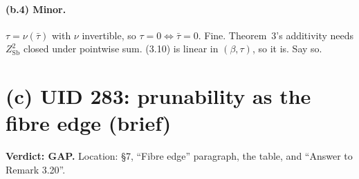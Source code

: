 \documentclass[11pt]{article}
\newcommand{\verdict}[1]{\textbf{Verdict: #1.}}
\begin{document}
\paragraph{(b.4) Minor.} $\tau=\nu(\bar\tau)$ with $\nu$ invertible, so $\tau=0\iff\bar\tau=0$. Fine. Theorem~3's
additivity needs $Z^2_{\mathrm{Sb}}$ closed under pointwise sum. (3.10) is linear in $(\beta,\tau)$, so it is. Say so.

\section*{(c) UID 283: prunability as the fibre edge (brief)}

\verdict{GAP} Location: \S7, ``Fibre edge'' paragraph, the table, and ``Answer to Remark 3.20''.
\end{document}
